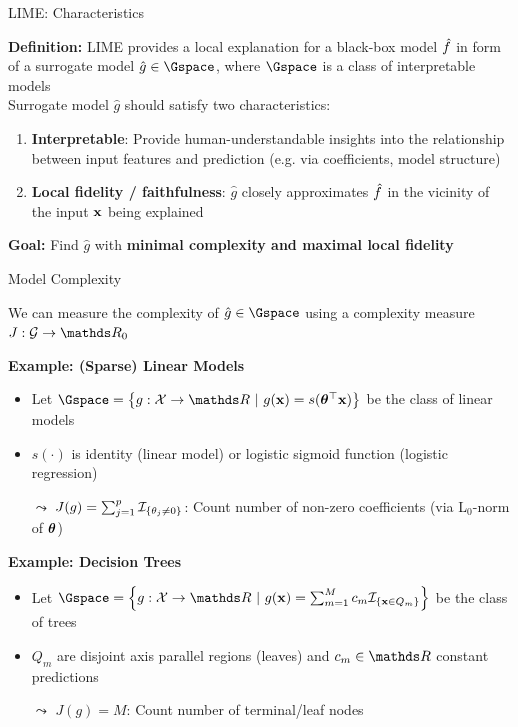 \documentclass[10pt,compress,t,notes=noshow, xcolor=table]{beamer}
\newcommand{\gh}{\hat{g}}
\begin{document}
\begin{frame}{LIME: Characteristics}

    \textbf{Definition:}
	LIME provides a local explanation for a black-box model $\hat{f}$ in form of a surrogate model $\gh \in \Gspace$, where $\Gspace$ is a class of interpretable models\\[2em]
	
	
	Surrogate model $\gh$ should satisfy two characteristics:
	\begin{enumerate}
		\item \textbf{Interpretable}: Provide human-understandable insights into the relationship between input features and prediction (e.g. via coefficients, model structure)
	\item \textbf{Local fidelity / faithfulness}: 
    $\gh$ closely approximates $\hat{f}$ in the vicinity of the input $\mathbf{x}$ being explained
	\end{enumerate}
	
	\vspace{2em}
	\textbf{Goal:} Find $\gh$ with \textbf{minimal complexity and maximal local fidelity} 
\end{frame}


\begin{frame}{Model Complexity}
    
    We can measure the complexity of $\gh \in \Gspace$ using a complexity measure $J: \mathcal{G} \to \R_{0}$ \lz %

 	\textbf{Example: (Sparse) Linear Models}\\
 	\begin{itemize}
 	    \item Let $\Gspace = \left\{g: \Xspace \to \R ~|~g(\xv) = s(\thetav^\top \xv)\right\}$ be the class of linear models
 	    \item $s(\cdot)$ is identity (linear model) or logistic sigmoid function  (logistic regression)
 	    \item[$\leadsto$] $J(g) = \sum_{j = 1}^p \mathcal{I}_{\{ \theta_j \neq 0 \}}$: Count number of non-zero coefficients (via L$_0$-norm of $\bm{\theta}$)
 	\end{itemize}
 	\lz\pause
 	
 	\textbf{Example: Decision Trees}\\
 	\begin{itemize}
 	    \item Let $\Gspace = \left\{g:\Xspace \to \R ~|~g(\xv) = \sum_{m=1}^M c_m \ind_{\{ \xv \in Q_m \}}\right\}$ be the class of trees
        \item $Q_m$ are disjoint axis parallel regions (leaves) and $c_m \in \R$ constant predictions
 	    \item[$\leadsto$] $J(g) = M$: Count number of terminal/leaf nodes
 	\end{itemize}
 	
\end{frame}
 
\end{document}
